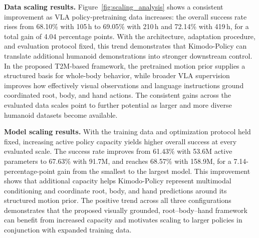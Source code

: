 \textbf{Data scaling results.} Figure~\ref{fig:scaling_analysis} shows a consistent improvement as VLA policy-pretraining data increases: the overall success rate rises from 68.10\% with 105\,h to 69.05\% with 210\,h and 72.14\% with 419\,h, for a total gain of 4.04 percentage points. With the architecture, adaptation procedure, and evaluation protocol fixed, this trend demonstrates that Kimodo-Policy can translate additional humanoid demonstrations into stronger downstream control. In the proposed T2M-based framework, the pretrained motion prior supplies a structured basis for whole-body behavior, while broader VLA supervision improves how effectively visual observations and language instructions ground coordinated root, body, and hand actions. The consistent gains across the evaluated data scales point to further potential as larger and more diverse humanoid datasets become available.

\textbf{Model scaling results.} With the training data and optimization protocol held fixed, increasing active policy capacity yields higher overall success at every evaluated scale. The success rate improves from 61.43\% with 53.6M active parameters to 67.63\% with 91.7M, and reaches 68.57\% with 158.9M, for a 7.14-percentage-point gain from the smallest to the largest model. This improvement shows that additional capacity helps Kimodo-Policy represent multimodal conditioning and coordinate root, body, and hand predictions around its structured motion prior. The positive trend across all three configurations demonstrates that the proposed visually grounded, root--body--hand framework can benefit from increased capacity and motivates scaling to larger policies in conjunction with expanded training data.

\begingroup

